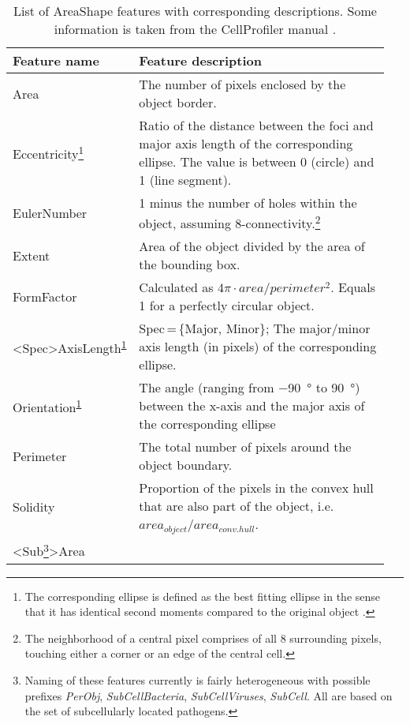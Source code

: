 \renewcommand{\arraystretch}{1.5}
\setlength{\tabcolsep}{0.2em}
\begin{table}
  \begin{minipage}{\textwidth}
  \centering
  \caption[List of AreaShape features with corresponding descriptions.]{List of AreaShape features with corresponding descriptions. Some information is taken from the CellProfiler manual \citep{Carpenter2006}.}
  \label{tab:areashape-feats}
  \footnotesize
  \begin{tabular}{L{0.25\linewidth}L{0.7\linewidth}}
    Feature name &
      Feature description \\
    \hline 
    Area &
      The number of pixels enclosed by the object border. \\
    Eccentricity\footnote{\label{fn:ellipse} The corresponding ellipse is defined as the best fitting ellipse in the sense that it has identical second moments compared to the original object \citep{Rocha2002}.} &
      Ratio of the distance between the foci and major axis length of the corresponding ellipse. The value is between 0 (circle) and 1 (line segment).\\
    EulerNumber &
      1 minus the number of holes within the object, assuming 8-connectivity.\footnote{The neighborhood of a central pixel comprises of all 8 surrounding pixels, touching either a corner or an edge of the central cell.} \\
    Extent &
      Area of the object divided by the area of the bounding box. \\
    FormFactor &
      Calculated as $4\pi \cdot area/perimeter^2$. Equals 1 for a perfectly circular object. \\
    <Spec>AxisLength\textsuperscript{\ref{fn:ellipse}} &
      Spec\,=\,\{Major, Minor\}; The major\slash minor axis length (in pixels) of the corresponding ellipse. \\
    Orientation\textsuperscript{\ref{fn:ellipse}} &
      The angle (ranging from \SI{-90}{\degree} to \SI{90} {\degree}) between the x-axis and the major axis of the corresponding ellipse \\
    Perimeter &
      The total number of pixels around the object boundary. \\
    Solidity &
      Proportion of the pixels in the convex hull that are also part of the object, i.e. $area_{object}/area_{conv. hull}$. \\
    <Sub\footnote{\label{fn:subcellular} Naming of these features currently is fairly heterogeneous with possible prefixes \textit{PerObj}, \textit{SubCellBacteria}, \textit{SubCellViruses}, \textit{SubCell}. All are based on the set of subcellularly located pathogens.}>Area &

\end{tabular}
\end{minipage}
\end{table}
